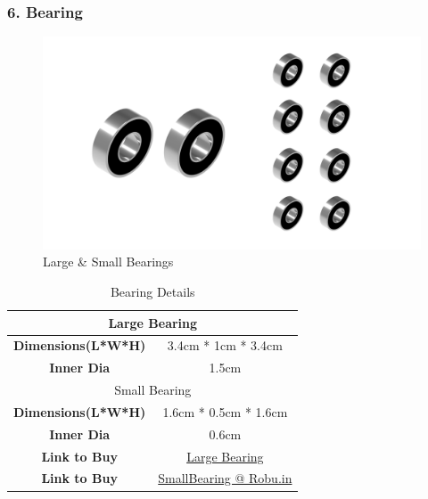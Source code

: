 \documentclass[12pt,a4paper,oneside]{book}
\begin{document}
			\subsubsection*{6. Bearing}
				\begin{figure}[H]
					\centering
					\includegraphics[scale=1]{BEARING}
					\caption{Large \& Small Bearings}	 
				\end{figure}
				\begin{table}[H]
					\centering
					\def\arraystretch{1.5}
					\caption{Bearing Details}
					\vspace{0.5cm}
					\begin{tabular}{|c||c|}
						\hline
						\multicolumn{2}{|c|}{Large Bearing}\\\hline
						\textbf{Dimensions(L*W*H)} & 3.4cm * 1cm * 3.4cm\\\hline
						\textbf{Inner Dia} & 1.5cm\\\hline
						\multicolumn{2}{|c|}{Small Bearing}\\\hline						
						\textbf{Dimensions(L*W*H)} & 1.6cm * 0.5cm * 1.6cm\\\hline
						\textbf{Inner Dia} & 0.6cm\\\hline 
						\textbf{Link to Buy} & \href{https://omrook.com/bearing/ball-bearing/series-6200/6202-zz-id-15mm-od-35mm-deep-groove-ball-bearing-15x35x11/?gclid=CjwKCAjw6fyXBhBgEiwAhhiZsknjuPBmqFP17BJH1Lhju9C-yQazRN_64urzpzRYuYJUoWjsgJFw3RoCs8wQAvD_BwE}{Large Bearing}\\\hline
						\textbf{Link to Buy} & \href{https://robu.in/product/696zz-bearing-6x15x5-stainless-steel-shielded-miniature-bearings-4pcs/}{SmallBearing @ Robu.in}\\\hline
					\end{tabular}
				\end{table}
				\pagebreak
				
\end{document}
